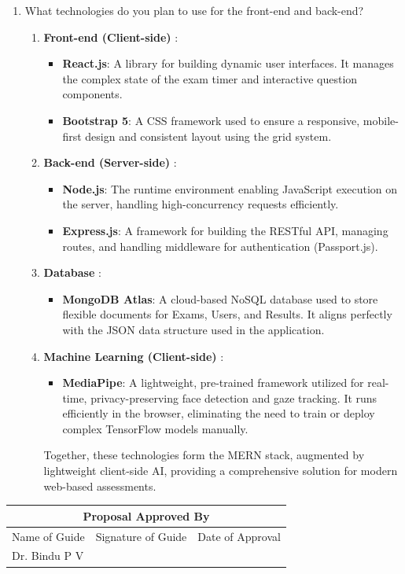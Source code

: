 \documentclass[14pt]{article}
\begin{document}
\begin{enumerate}
\item What technologies do you plan to use for the front-end and back-end?
\begin{enumerate}
\item \textbf{Front-end (Client-side)} :
\begin{itemize}
\item \textbf{React.js}: A library for building dynamic user interfaces. It manages the complex state of the exam timer and interactive question components.
\item \textbf{Bootstrap 5}: A CSS framework used to ensure a responsive, mobile-first design and consistent layout using the grid system.
\end{itemize}
\item \textbf{Back-end (Server-side)} :
\begin{itemize}
\item \textbf{Node.js}: The runtime environment enabling JavaScript execution on the server, handling high-concurrency requests efficiently.
\item \textbf{Express.js}: A framework for building the RESTful API, managing routes, and handling middleware for authentication (Passport.js).
\end{itemize}
\item \textbf{Database} :
\begin{itemize}
\item \textbf{MongoDB Atlas}: A cloud-based NoSQL database used to store flexible documents for Exams, Users, and Results. It aligns perfectly with the JSON data structure used in the application.
\end{itemize}
\item \textbf{Machine Learning (Client-side)} :
\begin{itemize}
\item \textbf{MediaPipe}: A lightweight, pre-trained framework utilized for real-time, privacy-preserving face detection and gaze tracking. It runs efficiently in the browser, eliminating the need to train or deploy complex TensorFlow models manually.
\end{itemize}
\tabto{.5cm} Together, these technologies form the MERN stack, augmented by lightweight client-side AI, providing a comprehensive solution for modern web-based assessments.
\end{enumerate}

\end{enumerate}
\begin{table}[ht!]
\begin{center}
\begin{tabular}{|cll|}
\hline
\multicolumn{3}{|c|}{\textbf{Proposal Approved By}}                                                                   \\ \hline
\multicolumn{1}{|c|}{Name of Guide} & \multicolumn{1}{c|}{Signature of Guide} & \multicolumn{1}{c|}{Date of Approval} \\ \hline
\multicolumn{1}{|l|}{Dr. Bindu P V}              & \multicolumn{1}{l|}{}                   &                                       \\ \hline
\end{tabular}
\end{center}
\end{table}
\end{document}
